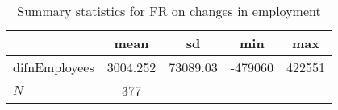 \begin{table}[htbp]\centering
\def\sym#1{\ifmmode^{#1}\else\(^{#1}\)\fi}
\caption{Summary statistics for FR on changes in employment}
\begin{tabular}{l*{1}{cccc}}
\hline\hline
            &        mean&          sd&         min&         max\\
\hline
difnEmployees&    3004.252&    73089.03&     -479060&      422551\\
\hline
\(N\)       &         377&            &            &            \\
\hline\hline
\end{tabular}
\end{table}
